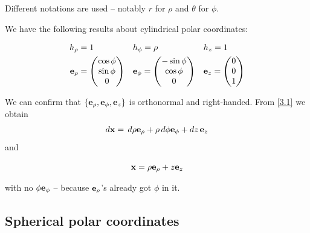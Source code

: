 \documentclass{../template/note}
\begin{document}
    Different notations are used -- notably \(r\) for \(\rho\) and \(\theta\) for \(\phi\).

    We have the following results about cylindrical polar coordinates:
    \begin{proposition}
        \label{3.2} \begin{align*}
            h_\rho &= 1 && h_\phi = \rho && h_z = 1 \\
            \V e_\rho &= \begin{pmatrix}
             \cos \phi \\
             \sin \phi \\
             0 \\
            \end{pmatrix} && \V e_\phi = \begin{pmatrix}
             -\sin \phi \\
             \cos \phi \\
             0 \\
            \end{pmatrix} && \V e_z = \begin{pmatrix}
             0 \\
             0 \\
             1 \\
            \end{pmatrix}
        \end{align*}
    \end{proposition}
    
    We can confirm that \(\{\V e_\rho, \V e_\phi, \V e_z\}\) is orthonormal and right-handed. From \cref{3.1} we obtain
    \begin{align*}
        d \V x = \D \rho \V e_\rho + \rho \D \phi \V e_\phi + dz\, \V e_z
    \end{align*}
    and
    \begin{proposition}
        \label{3.3} \[
            \V x = \rho \V e_\rho + z \V e_z
        \]
    \end{proposition}
    with no \(\phi \V e_\phi\) -- because \(\V e_\rho\)'s already got \(\phi\) in it.
    
    \subsection{Spherical polar coordinates}
\end{document}

